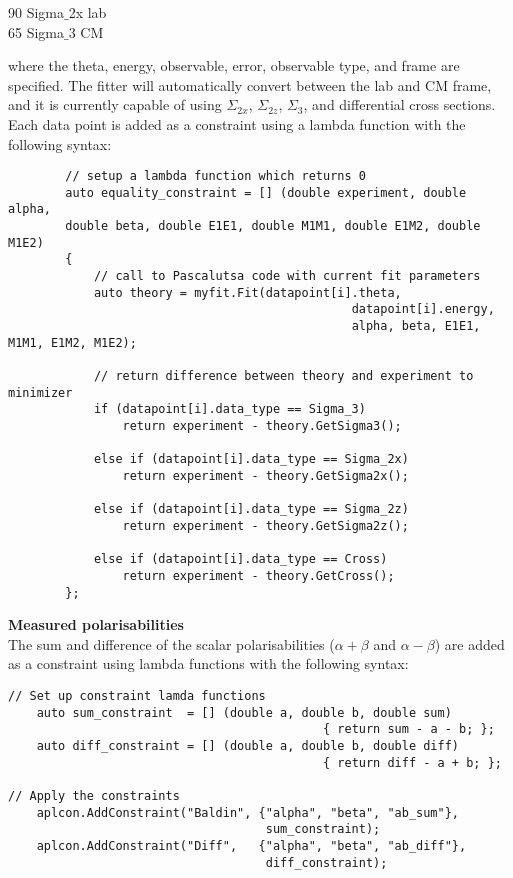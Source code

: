 \documentclass[]{article}
\begin{document}
\begin{center}
	90    \quad Sigma$\_$2x \quad lab\\
	\hspace{1mm}65    \quad Sigma$\_$3 \quad \hspace{2mm}CM\\
\end{center}

\noindent where the theta, energy, observable, error, observable type, and frame are specified. The fitter will automatically convert between the lab and CM frame, and it is currently capable of using $\Sigma_{2x}$, $\Sigma_{2z}$, $\Sigma_{3}$, and differential cross sections. Each data point is added as a constraint using a lambda function with the following syntax:\\

\begin{lstlisting}
        // setup a lambda function which returns 0
        auto equality_constraint = [] (double experiment, double alpha, 
        double beta, double E1E1, double M1M1, double E1M2, double M1E2) 
        {
	        // call to Pascalutsa code with current fit parameters
	        auto theory = myfit.Fit(datapoint[i].theta, 
										        datapoint[i].energy,
										        alpha, beta, E1E1, M1M1, E1M2, M1E2);       
        
	        // return difference between theory and experiment to minimizer
	        if (datapoint[i].data_type == Sigma_3)
				return experiment - theory.GetSigma3();
				
	        else if (datapoint[i].data_type == Sigma_2x)
				return experiment - theory.GetSigma2x();
				
	        else if (datapoint[i].data_type == Sigma_2z)
				return experiment - theory.GetSigma2z();
				
	        else if (datapoint[i].data_type == Cross)
				return experiment - theory.GetCross();
        };
\end{lstlisting}

\noindent \textbf{Measured polarisabilities} \\

The sum and difference of the scalar polarisabilities ($\alpha+\beta$ and $\alpha-\beta$) are added as a constraint using lambda functions with the following syntax: \\

\begin{lstlisting}
// Set up constraint lamda functions
    auto sum_constraint  = [] (double a, double b, double sum)
										    { return sum - a - b; };
    auto diff_constraint = [] (double a, double b, double diff)
										    { return diff - a + b; };
    
// Apply the constraints
    aplcon.AddConstraint("Baldin", {"alpha", "beta", "ab_sum"},  
									sum_constraint);
    aplcon.AddConstraint("Diff",   {"alpha", "beta", "ab_diff"}, 
								    diff_constraint);
\end{lstlisting}
\end{document}
